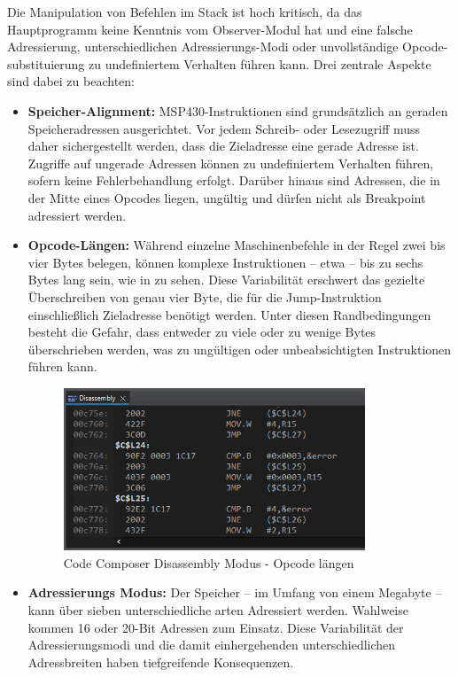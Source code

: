 Die Manipulation von Befehlen im Stack ist hoch kritisch, da das Hauptprogramm keine Kenntnis vom Observer-Modul hat und eine falsche Adressierung, unterschiedlichen Adressierungs-Modi oder unvollst\"andige Opcode-substituierung zu undefiniertem Verhalten f\"uhren kann. Drei zentrale Aspekte sind dabei zu beachten:

\begin{itemize}
	\item \textbf{Speicher-Alignment:} MSP430-Instruktionen sind grunds\"atzlich an geraden Speicheradressen ausgerichtet. Vor jedem Schreib- oder Lesezugriff muss daher sichergestellt werden, dass die Zieladresse eine gerade Adresse ist. Zugriffe auf ungerade Adressen k\"onnen zu undefiniertem Verhalten f\"uhren, sofern keine Fehlerbehandlung erfolgt. Dar\"uber hinaus sind Adressen, die in der Mitte eines Opcodes liegen, ung\"ultig und d\"urfen nicht als Breakpoint adressiert werden.
	
	\item \textbf{Opcode-L\"angen:} W\"ahrend einzelne Maschinenbefehle in der Regel zwei bis vier Bytes belegen, k\"onnen komplexe Instruktionen – etwa  – bis zu sechs Bytes lang sein, wie in  zu sehen.  Diese Variabilit\"at erschwert das gezielte \"Uberschreiben von genau vier Byte, die f\"ur die Jump-Instruktion einschlie{\ss}lich Zieladresse ben\"otigt werden. Unter diesen Randbedingungen besteht die Gefahr, dass entweder zu viele oder zu wenige Bytes \"uberschrieben werden, was zu ung\"ultigen oder unbeabsichtigten Instruktionen f\"uhren kann.
	
	\begin{figure}[h!]
		\centering
		\includegraphics[width=0.85\textwidth]{../Bilder/OpcodeLaengen.png}
		\caption{Code Composer Disassembly Modus - Opcode l\"angen}
		\label{fig:DisassemblyOpcodeLaengen}
	\end{figure}
	
	\newpage
	\item \textbf{Adressierungs Modus:} Der Speicher -- im Umfang von einem Megabyte -- kann \"uber sieben unterschiedliche arten Adressiert werden. Wahlweise kommen 16 oder 20-Bit Adressen zum Einsatz. Diese Variabilit\"at der Adressierungsmodi und die damit einhergehenden unterschiedlichen Adressbreiten haben tiefgreifende Konsequenzen. 
\end{itemize}

